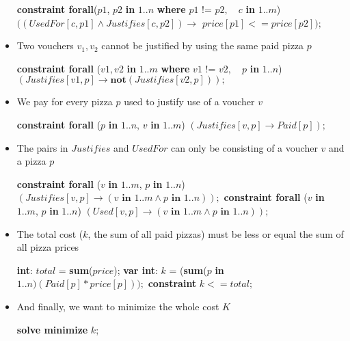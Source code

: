 \documentclass[conference]{IEEEtran}
\newcommand\tab[1][0.3cm]{\hspace*{#1}}
\begin{document}
\begin{itemize}
\begin{algorithmic}
\State \textbf{constraint forall}($p1$, $p2$ \textbf{in} $1..n$ \textbf{where} $p1 \text{ != } p2,$
\State \tab\tab\tab\tab\tab\tab\tab\tab $\text{ } c$ \textbf{in} $1..m$)
\State \tab\tab $((UsedFor[c, p1] \land Justifies[c, p2]) \rightarrow$
\State \tab\tab\tab\tab $price[p1] <= price[p2]);$
\\
\end{algorithmic}
\item Two vouchers $v_1, v_2$ cannot be justified by using the same paid pizza $p$
\begin{algorithmic}
\State \textbf{constraint forall} ($v1, v2$ \textbf{in} $1..m$ \textbf{where} $v1$ != $v2,$
\State \tab\tab\tab\tab\tab\tab\tab\tab $\text{ } p$ \textbf{in} $1..n$)
\State \tab\tab $(Justifies[v1, p] \rightarrow \textbf{not} (Justifies[v2, p]));$
\\
\end{algorithmic}
\item We pay for every pizza $p$ used to justify use of a voucher $v$
\begin{algorithmic}
\State \textbf{constraint forall} ($p$ \textbf{in} $1..n$, $v$ \textbf{in} $1..m$)
\State \tab\tab $(Justifies[v, p] \rightarrow Paid[p]);$
\\
\end{algorithmic}
\item The pairs in $Justifies$ and $UsedFor$ can only be consisting of a voucher $v$ and a pizza $p$
\begin{algorithmic}
\State \textbf{constraint forall} ($v$ \textbf{in} $1..m$, $p$ \textbf{in} $1..n$)
\State \tab\tab $(Justifies[v, p] \rightarrow (v \textbf{ in } 1..m \land p \textbf{ in } 1..n));$
\State \textbf{constraint forall} ($v$ \textbf{in} $1..m$, $p$ \textbf{in} $1..n$)
\State \tab\tab $(Used[v, p] \rightarrow (v \textbf{ in } 1..m \land p \textbf{ in } 1..n));$
\\
\end{algorithmic}
\item The total cost ($k$, the sum of all paid pizzas) must be less or equal the sum of all pizza prices
\begin{algorithmic}
\State \textbf{int}: $total$ = \textbf{sum}($price$);
\State \textbf{var int}: $k$ = (\textbf{sum}($p$ \textbf{in} $1..n)(Paid[p] * price[p]));$
\State \textbf{constraint} $k <= total;$
\\
\end{algorithmic}
\item And finally, we want to minimize the whole cost $K$
\begin{algorithmic}
\State \textbf{solve minimize} $k$;
\\
\end{algorithmic}
\end{itemize}
\end{document}
